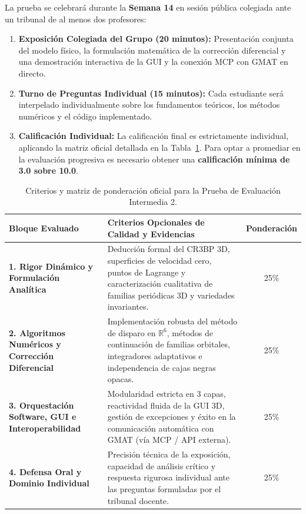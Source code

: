 \documentclass[11pt, a4paper]{article}
\begin{document}
	La prueba se celebrará durante la \textbf{Semana 14} en sesión pública colegiada ante un tribunal de al menos dos profesores:
	\begin{enumerate}[leftmargin=*]
		\item \textbf{Exposición Colegiada del Grupo (20 minutos):} Presentación conjunta del modelo físico, la formulación matemática de la corrección diferencial y una demostración interactiva de la GUI y la conexión MCP con GMAT en directo.
		\item \textbf{Turno de Preguntas Individual (15 minutos):} Cada estudiante será interpelado individualmente sobre los fundamentos teóricos, los métodos numéricos y el código implementado.
		\item \textbf{Calificación Individual:} La calificación final es estrictamente individual, aplicando la matriz oficial detallada en la Tabla~\ref{tab:rubrica_pei2}. Para optar a promediar en la evaluación progresiva es necesario obtener una \textbf{calificación mínima de 3.0 sobre 10.0}.
	\end{enumerate}
	
	\begin{table}[htbp]
		\centering  
		\small
		\begin{tabularx}{\textwidth}{p{4.5cm} X c}
			\toprule
			\textbf{Bloque Evaluado} & \textbf{Criterios Opcionales de Calidad y Evidencias} & \textbf{Ponderación} \\
			\midrule
			\textbf{1. Rigor Dinámico y Formulación Analítica} & Deducción formal del CR3BP 3D, superficies de velocidad cero, puntos de Lagrange y caracterización cualitativa de familias periódicas 3D y variedades invariantes. & 25\% \\
			\addlinespace[0.4em]
			\textbf{2. Algoritmos Numéricos y Corrección Diferencial} & Implementación robusta del método de disparo en $\mathbb{R}^6$, métodos de continuación de familias orbitales, integradores adaptativos e independencia de cajas negras opacas. & 25\% \\
			\addlinespace[0.4em]
			\textbf{3. Orquestación Software, GUI e Interoperabilidad} & Modularidad estricta en 3 capas, reactividad fluida de la GUI 3D, gestión de excepciones y éxito en la comunicación automática con GMAT (vía MCP / API externa). & 25\% \\
			\addlinespace[0.4em]
			\textbf{4. Defensa Oral y Dominio Individual} & Precisión técnica de la exposición, capacidad de análisis crítico y respuesta rigurosa individual ante las preguntas formuladas por el tribunal docente. & 25\% \\
			\bottomrule
		\end{tabularx}
		\caption{Criterios y matriz de ponderación oficial para la Prueba de Evaluación 
		Intermedia 2.}
		\label{tab:rubrica_pei2}
	\end{table}
	
\end{document}
